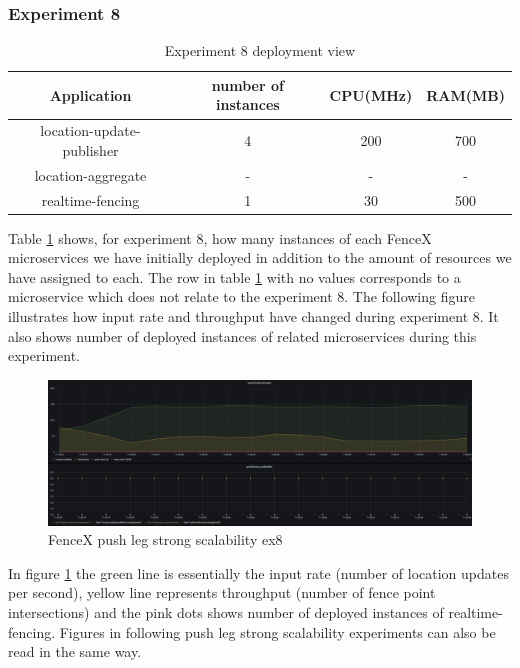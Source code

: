 \documentclass[a4]{report}
\begin{document}
    \subsubsection{Experiment 8}
    \begin{table}[h!]
        \centering
        \begin{tabular}{|c|c|c|c|}
            \hline
            Application               & number of instances & CPU(MHz) & RAM(MB) \\
            \hline
            location-update-publisher & 4                   & 200      & 700     \\
            location-aggregate        & -                   & -        & -       \\
            realtime-fencing          & 1                   & 30       & 500     \\
            \hline
        \end{tabular}
        \caption{Experiment 8 deployment view}
        \label{table:ex8-dv}
    \end{table}

    Table \ref{table:ex8-dv} shows, for experiment 8, how many instances of each FenceX microservices we have initially
    deployed in addition to the amount of resources we have assigned to each.
    The row in table \ref{table:ex8-dv} with no values corresponds to a microservice which does not relate to the
    experiment 8.
    The following figure illustrates how input rate and throughput have changed during experiment 8.
    It also shows number of deployed instances of related microservices during this experiment.

    \begin{figure}
        \caption{FenceX push leg strong scalability ex8}
        \label{fig:ex8}
        \includegraphics[scale=0.5]{images/evaluation/ex8-benchmarking-ongoing-2per4sec.png}
    \end{figure}

    \clearpage

    In figure \ref{fig:ex8} the green line is essentially the input rate (number of location updates per second),
    yellow line represents throughput (number of fence point intersections) and the pink dots shows number of
    deployed instances of realtime-fencing.
    Figures in following push leg strong scalability experiments can also be read in the same way.
\end{document}
